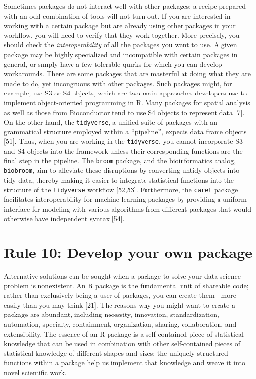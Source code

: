 \documentclass[10pt,letterpaper]{article}
\begin{document}
Sometimes packages do not interact well with other packages; a recipe
prepared with an odd combination of tools will not turn out. If you are
interested in working with a certain package but are already using other
packages in your workflow, you will need to verify that they work
together. More precisely, you should check the \emph{interoperability}
of all the packages you want to use. A given package may be highly
specialized and incompatible with certain packages in general, or simply
have a few tolerable quirks for which you can develop workarounds. There
are some packages that are masterful at doing what they are made to do,
yet incongruous with other packages. Such packages might, for example,
use S3 or S4 objects, which are two main approaches developers use to
implement object-oriented programming in R. Many packages for spatial
analysis as well as those from Bioconductor tend to use S4 objects to
represent data {[}7{]}. On the other hand, the \texttt{tidyverse}, a
unified suite of packages with an grammatical structure employed within
a ``pipeline'', expects data frame objects {[}51{]}. Thus, when you are
working in the \texttt{tidyverse}, you cannot incorporate S3 and S4
objects into the framework unless their corresponding functions are the
final step in the pipeline. The \texttt{broom} package, and the
bioinformatics analog, \texttt{biobroom}, aim to alleviate these
disruptions by converting untidy objects into tidy data, thereby making
it easier to integrate statistical functions into the structure of the
\texttt{tidyverse} workflow {[}52,53{]}. Furthermore, the \texttt{caret}
package facilitates interoperability for machine learning packages by
providing a uniform interface for modeling with various algorithms from
different packages that would otherwise have independent syntax
{[}54{]}.

\hypertarget{rule-10-develop-your-own-package}{%
\section{Rule 10: Develop your own
package}\label{rule-10-develop-your-own-package}}

Alternative solutions can be sought when a package to solve your data
science problem is nonexistent. An R package is the fundamental unit of
shareable code; rather than exclusively being a user of packages, you
can create them---more easily than you may think {[}21{]}. The reasons
why you might want to create a package are abundant, including
necessity, innovation, standardization, automation, specialty,
containment, organization, sharing, collaboration, and extensibility.
The essence of an R package is a self-contained piece of statistical
knowledge that can be used in combination with other self-contained
pieces of statistical knowledge of different shapes and sizes; the
uniquely structured functions within a package help us implement that
knowledge and weave it into novel scientific work.
\end{document}
